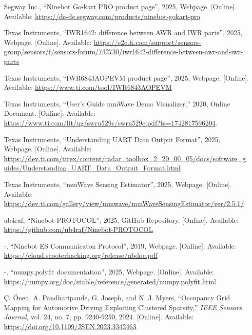 \newpage

\begin{thebibliography}{00}

 Segway Inc., ``Ninebot Go-kart PRO product page'', 2025, Webpage. [Online]. Available: \url{https://de-de.segway.com/products/ninebot-gokart-pro}

 Texas Instruments, ``IWR1642: difference between AWR and IWR parts'', 2025, Webpage. [Online]. Available: \url{https://e2e.ti.com/support/sensors-group/sensors/f/sensors-forum/742730/iwr1642-difference-between-awr-and-iwr-parts}

 Texas Instruments, ``IWR6843AOPEVM product page'', 2025, Webpage. [Online]. Available: \url{https://www.ti.com/tool/IWR6843AOPEVM}

 Texas Instruments, ``User's Guide mmWave Demo Visualizer,'' 2020, Online Document. [Online]. Available: \url{https://www.ti.com/lit/ug/swru529c/swru529c.pdf?ts=1742817596204}.

 Texas Instruments, ``Understanding UART Data Output Format'', 2025, Webpage. [Online]. Available: \url{https://dev.ti.com/tirex/content/radar_toolbox_2_20_00_05/docs/software_guides/Understanding_UART_Data_Output_Format.html}

 Texas Instruments, ``mmWave Sensing Estimator'', 2025, Webpage. [Online]. Available: \url{https://dev.ti.com/gallery/view/mmwave/mmWaveSensingEstimator/ver/2.5.1/}


 ub4raf, ``Ninebot-PROTOCOL'', 2025, GitHub Repository. [Online]. Available: \url{https://github.com/ub4raf/Ninebot-PROTOCOL}

 -, ``Ninebot ES Communicaton Protocol'', 2019, Webpage. [Online]. Available: \url{https://cloud.scooterhacking.org/release/nbdoc.pdf}

 -, ``numpy.polyfit documentation'', 2025, Webpage. [Online]. Available: \url{https://numpy.org/doc/stable/reference/generated/numpy.polyfit.html}

 Ç. Önen, A. Pandharipande, G. Joseph, and N. J. Myers, ``Occupancy Grid Mapping for Automotive Driving Exploiting Clustered Sparsity,'' \textit{IEEE Sensors Journal}, vol. 24, no. 7, pp. 9240-9250, 2024. [Online]. Available: \url{https://doi.org/10.1109/JSEN.2023.3342463}.


\end{thebibliography}
